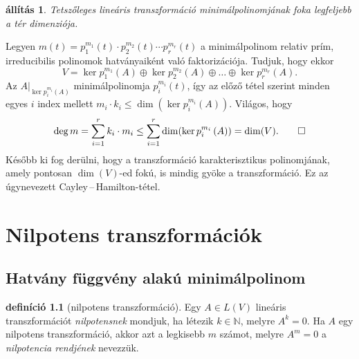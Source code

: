 \documentclass[9pt, a4paper, showtrims]{memoir}
\makeatletter
\renewenvironment{proof}[1][\proofname]
    {\par\pushQED{\qed}%
    \normalfont \topsep6\p@\@plus6\p@\relax
    \trivlist
    \item[\hskip\labelsep
        \itshape
    #1\@addpunct{:}]\ignorespaces}
    {\popQED\endtrivlist\@endpefalse}
\theoremstyle{plain}
\newtheorem{proposition}{állítás}[chapter]
\theoremstyle{remark}
\theoremstyle{definition}
\newtheorem{definition}[proposition]{definíció}
\makeatother
\begin{document}
\begin{proposition}
	Tetszőleges lineáris transzformáció minimálpolinomjának foka legfeljebb a tér dimenziója.
	\label{th:minpol}
\end{proposition}
\begin{proof}
	Legyen
	$
		m\left( t \right)
		=
		p_1^{m_1}\left( t \right)\cdot
		p_2^{m_2}\left( t \right)\cdots
		p_r^{m_r}\left( t \right)
	$
	a minimálpolinom relativ prím, irreducibilis polinomok hatványaiként való faktorizációja.
	Tudjuk, hogy ekkor
	\[
		V
		=
		\ker p_1^{m_1}\left( A \right)
		\oplus
		\ker p_2^{m_2}\left( A \right)
		\oplus\dots\oplus
		\ker p_r^{m_r}\left( A \right).
	\]
	Az $A|_{\ker p_i^{m_i}\left( A \right)}$ minimálpolinomja $p_i^{m_i}\left( t \right)$, így az előző tétel szerint minden egyes $i$ index mellett
	$
		m_i\cdot k_i\leq \dim(\ker p_i^{m_i}\left( A \right)).
	$
	Világos, hogy
	\[
		\deg m
		=
		\sum_{i=1}^rk_i\cdot m_i
		\leq
		\sum_{i=1}^r\dim(\ker p_i^{m_i}\left( A \right))
		=
		\dim(V).\qedhere
	\]
\end{proof}
Később ki fog derülni,
hogy a transzformáció karakterisztikus polinomjának, amely pontosan $\dim(V)$-ed fokú,
is mindig gyöke a transzformáció.
Ez az úgynevezett Cayley\,--\,Hamilton-tétel.
\chapter{Nilpotens transzformációk}
\section{Hatvány függvény alakú minimálpolinom}
\begin{definition}[nilpotens transzformáció]
	Egy $A\in L\left( V \right)$ lineáris transzformációt
	\emph{nilpotensnek} mondjuk, ha
	létezik $k\in\mathbb{N}$, melyre $A^k=0$.
	Ha $A$ egy nilpotens transzformáció, akkor azt a legkisebb $m$ számot, melyre $A^m=0$ a \emph{nilpotencia rendjének} nevezzük.
\end{definition}
\end{document}
